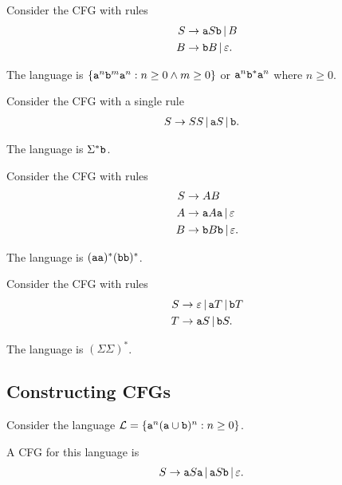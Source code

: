 \documentclass{notes}
\begin{document}
\begin{eg}
  Consider the CFG with rules 
  \begin{align*}
    S &\to \verb~a~ S \verb~b~ \, | \, B \\ 
    B &\to \verb~b~ B \, | \, \varepsilon.
  \end{align*}
  
  The language is $\left \{ \verb~a~^n \verb~b~^m \verb~a~^n : n \geq 0 \land m \geq 0 \right \}$ or $\verb~a~^n \verb~b~^* \verb~a~^n$ where $n \geq 0$.
\end{eg}

\begin{eg}
  Consider the CFG with a single rule 
  \begin{align*}
    S &\to SS \, | \, \verb~a~ S \, | \, \verb~b~.
  \end{align*}
  
  The language is $\Sigma^* \verb~b~$.
\end{eg}

\begin{eg}
  Consider the CFG with rules 
  \begin{align*}
    S &\to AB \\ 
    A &\to \verb~a~ A \verb~a~ \, | \, \varepsilon \\ 
    B &\to \verb~b~ B \verb~b~ \, | \, \varepsilon.
  \end{align*}
  
  The language is $(\verb~aa~)^* (\verb~bb~)^*$.
\end{eg}

\begin{eg}
  Consider the CFG with rules 
  \begin{align*}
    S &\to \varepsilon \, | \, \verb~a~ T \, | \, \verb~b~ T \\ 
    T &\to \verb~a~ S \, | \, \verb~b~ S.
  \end{align*}
  
  The language is $(\Sigma \Sigma)^*$.
\end{eg}

\newpage

\subsection{Constructing CFGs}

\begin{eg}
  Consider the language $\mathcal L = \left \{ \verb~a~^n (\verb~a~ \cup \verb~b~)^n : n \geq 0 \right \}$.
  
  A CFG for this language is 
  \begin{align*}
    S &\to \verb~a~ S \verb~a~ \, | \, \verb~a~ S \verb~b~ \, | \, \varepsilon.
  \end{align*}
\end{eg}
\end{document}
